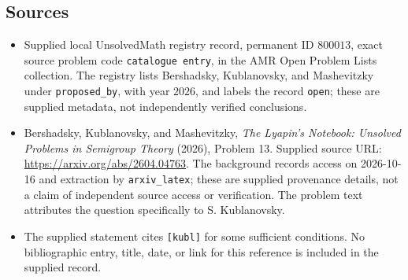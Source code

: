 \documentclass[11pt]{article}
\begin{document}
\subsection{Sources}
\begin{itemize}
\item Supplied local UnsolvedMath registry record, permanent ID \(800013\), exact source problem code \texttt{catalogue entry}, in the AMR Open Problem Lists collection. The registry lists Bershadsky, Kublanovsky, and Mashevitzky under \texttt{proposed\_by}, with year \(2026\), and labels the record \texttt{open}; these are supplied metadata, not independently verified conclusions.
\item Bershadsky, Kublanovsky, and Mashevitzky, \emph{The Lyapin's Notebook: Unsolved Problems in Semigroup Theory} (2026), Problem 13. Supplied source URL: \url{https://arxiv.org/abs/2604.04763}. The background records access on 2026-10-16 and extraction by \texttt{arxiv\_latex}; these are supplied provenance details, not a claim of independent source access or verification. The problem text attributes the question specifically to S. Kublanovsky.
\item The supplied statement cites \texttt{[kubl]} for some sufficient conditions. No bibliographic entry, title, date, or link for this reference is included in the supplied record.
\end{itemize}
\end{document}
